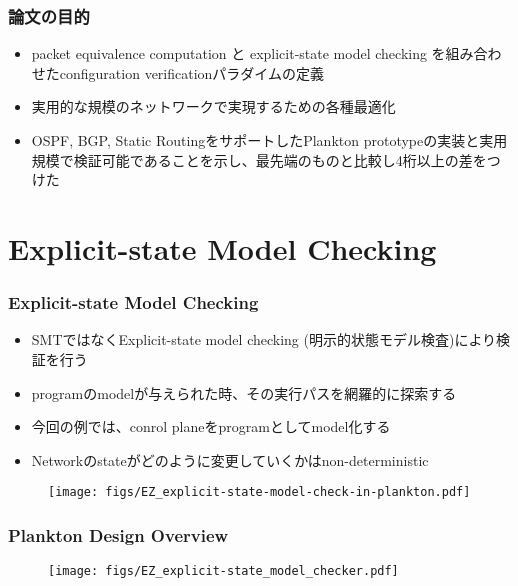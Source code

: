 \documentclass[dvipdfmx,9pt,notheorems]{beamer}
\theoremstyle{definition}
\begin{document}
\begin{frame}\frametitle{論文の目的}
\begin{itemize}
	\item packet equivalence computation と explicit-state model checking を組み合わせたconfiguration verificationパラダイムの定義
	\item 実用的な規模のネットワークで実現するための各種最適化
	\item OSPF, BGP, Static RoutingをサポートしたPlankton prototypeの実装と実用規模で検証可能であることを示し、最先端のものと比較し4桁以上の差をつけた
\end{itemize}
\end{frame}

\section{Explicit-state Model Checking}
\begin{frame}\frametitle{Explicit-state Model Checking}
\begin{itemize}
	\item SMTではなくExplicit-state model checking (明示的状態モデル検査)により検証を行う
	\item programのmodelが与えられた時、その実行パスを網羅的に探索する
	\item 今回の例では、conrol planeをprogramとしてmodel化する
	\item Networkのstateがどのように変更していくかはnon-deterministic
\end{itemize}
  \begin{figure}[htb]
    \centering
    \texttt{[image: figs/EZ\_explicit-state-model-check-in-plankton.pdf]}
  \end{figure}%
\pnote{
}
\end{frame}

\begin{frame}\frametitle{Plankton Design Overview}
  \begin{figure}[htb]
    \centering
    \texttt{[image: figs/EZ\_explicit-state\_model\_checker.pdf]}
  \end{figure}%
\end{frame}
\end{document}
